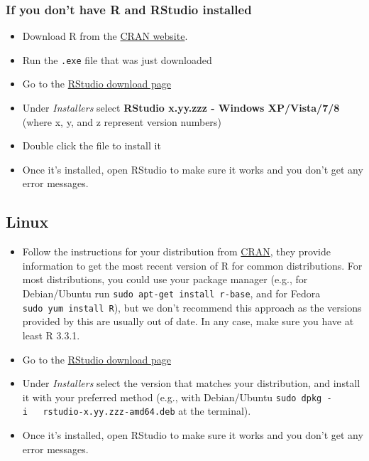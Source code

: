 \documentclass[]{book}
\providecommand{\tightlist}{%
  \setlength{\itemsep}{0pt}\setlength{\parskip}{0pt}}
\theoremstyle{definition}
\theoremstyle{definition}
\theoremstyle{definition}
\theoremstyle{remark}
\begin{document}
\subsubsection*{If you don't have R and RStudio
installed}\label{if-you-dont-have-r-and-rstudio-installed-1}

\begin{itemize}
\tightlist
\item
  Download R from the
  \href{http://cran.r-project.org/bin/windows/base/release.htm}{CRAN
  website}.
\item
  Run the \texttt{.exe} file that was just downloaded
\item
  Go to the
  \href{https://www.rstudio.com/products/rstudio/download/\#download}{RStudio
  download page}
\item
  Under \emph{Installers} select \textbf{RStudio x.yy.zzz - Windows
  XP/Vista/7/8} (where x, y, and z represent version numbers)
\item
  Double click the file to install it
\item
  Once it's installed, open RStudio to make sure it works and you don't
  get any error messages.
\end{itemize}

\subsection*{Linux}\label{linux}

\begin{itemize}
\tightlist
\item
  Follow the instructions for your distribution from
  \href{https://cloud.r-project.org/bin/linux}{CRAN}, they provide
  information to get the most recent version of R for common
  distributions. For most distributions, you could use your package
  manager (e.g., for Debian/Ubuntu run
  \texttt{sudo\ apt-get\ install\ r-base}, and for Fedora
  \texttt{sudo\ yum\ install\ R}), but we don't recommend this approach
  as the versions provided by this are usually out of date. In any case,
  make sure you have at least R 3.3.1.
\item
  Go to the
  \href{https://www.rstudio.com/products/rstudio/download/\#download}{RStudio
  download page}
\item
  Under \emph{Installers} select the version that matches your
  distribution, and install it with your preferred method (e.g., with
  Debian/Ubuntu \texttt{sudo\ dpkg\ -i\ \ \ rstudio-x.yy.zzz-amd64.deb}
  at the terminal).
\item
  Once it's installed, open RStudio to make sure it works and you don't
  get any error messages.
\end{itemize}
\end{document}
